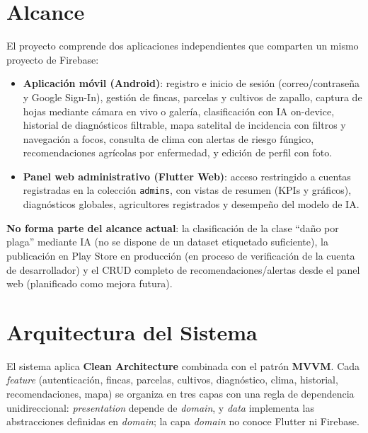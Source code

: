 \documentclass[12pt,a4paper]{article}
\begin{document}
\section{Alcance}

El proyecto comprende dos aplicaciones independientes que comparten un mismo
proyecto de Firebase:

\begin{itemize}
  \item \textbf{Aplicación móvil (Android)}: registro e inicio de sesión
        (correo/contraseña y Google Sign-In), gestión de fincas, parcelas y
        cultivos de zapallo, captura de hojas mediante cámara en vivo o galería,
        clasificación con IA on-device, historial de diagnósticos filtrable,
        mapa satelital de incidencia con filtros y navegación a focos, consulta
        de clima con alertas de riesgo fúngico, recomendaciones agrícolas por
        enfermedad, y edición de perfil con foto.
  \item \textbf{Panel web administrativo (Flutter Web)}: acceso restringido a
        cuentas registradas en la colección \texttt{admins}, con vistas de
        resumen (KPIs y gráficos), diagnósticos globales, agricultores
        registrados y desempeño del modelo de IA.
\end{itemize}

\textbf{No forma parte del alcance actual}: la clasificación de la clase
``daño por plaga'' mediante IA (no se dispone de un dataset etiquetado
suficiente), la publicación en Play Store en producción (en proceso de
verificación de la cuenta de desarrollador) y el CRUD completo de
recomendaciones/alertas desde el panel web (planificado como mejora futura).

\section{Arquitectura del Sistema}

El sistema aplica \textbf{Clean Architecture} combinada con el patrón
\textbf{MVVM}. Cada \textit{feature} (autenticación, fincas, parcelas,
cultivos, diagnóstico, clima, historial, recomendaciones, mapa) se organiza en
tres capas con una regla de dependencia unidireccional: \textit{presentation}
depende de \textit{domain}, y \textit{data} implementa las abstracciones
definidas en \textit{domain}; la capa \textit{domain} no conoce Flutter ni
Firebase.
\end{document}

